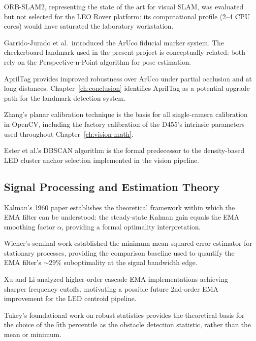 \textbf{\cite{murartal2017orbslam2}} ORB-SLAM2, representing the state of the art for visual SLAM, was evaluated but not selected for the LEO Rover platform: its computational profile (2--4 CPU cores) would have saturated the laboratory workstation.

\textbf{\cite{garridojurado2014automatic}} Garrido-Jurado et al.\ introduced the ArUco fiducial marker system. The checkerboard landmark used in the present project is conceptually related: both rely on the Perspective-n-Point algorithm for pose estimation.

\textbf{\cite{olson2011apriltag}} AprilTag provides improved robustness over ArUco under partial occlusion and at long distances. Chapter~\ref{ch:conclusion} identifies AprilTag as a potential upgrade path for the landmark detection system.

\textbf{\cite{zhang2000flexible}} Zhang's planar calibration technique is the basis for all single-camera calibration in OpenCV, including the factory calibration of the D455's intrinsic parameters used throughout Chapter~\ref{ch:vision-math}.

\textbf{\cite{ester1996density}} Ester et al.'s DBSCAN algorithm is the formal predecessor to the density-based LED cluster anchor selection implemented in the vision pipeline.

\subsection{Signal Processing and Estimation Theory}

\textbf{\cite{kalman1960new}} Kalman's 1960 paper establishes the theoretical framework within which the EMA filter can be understood: the steady-state Kalman gain equals the EMA smoothing factor $\alpha$, providing a formal optimality interpretation.

\textbf{\cite{wiener1949extrapolation}} Wiener's seminal work established the minimum mean-squared-error estimator for stationary processes, providing the comparison baseline used to quantify the EMA filter's $\sim$29\% suboptimality at the signal bandwidth edge.

\textbf{\cite{xu2007enhanced}} Xu and Li analyzed higher-order cascade EMA implementations achieving sharper frequency cutoffs, motivating a possible future 2nd-order EMA improvement for the LED centroid pipeline.

\textbf{\cite{tukey1977exploratory}} Tukey's foundational work on robust statistics provides the theoretical basis for the choice of the 5th percentile as the obstacle detection statistic, rather than the mean or minimum.

